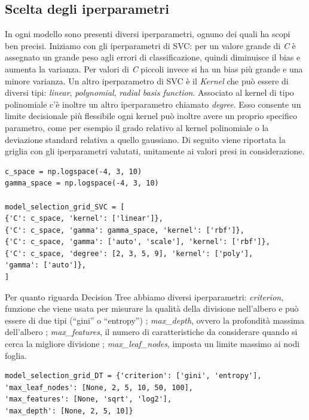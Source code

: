 \documentclass[12pt,italian]{report}
\begin{document}
\subsection{Scelta degli iperparametri}
\label{iperparametri}
In ogni modello sono presenti diversi iperparametri, ognuno dei quali ha scopi ben precisi. 
Iniziamo con gli iperparametri di SVC: per un valore grande di \emph{C} è assegnato un grande peso agli errori di classificazione, quindi diminuisce il bias e aumenta la varianza. Per valori di \emph{C} piccoli invece si ha un bias più grande e una minore varianza. 
Un altro iperparametro di SVC è il \emph{Kernel} che può essere di diversi tipi: \emph{linear}, \emph{polynomial}, \emph{radial basis function}. Associato al kernel di tipo polinomiale c'è inoltre un altro iperparametro chiamato \emph{degree}. Esso consente un limite decisionale più flessibile 
ogni kernel può inoltre avere un proprio specifico parametro, come per esempio il grado relativo al kernel polinomiale o la deviazione standard relativa a quello gaussiano.
Di seguito viene riportata la griglia con gli iperparametri valutati, unitamente ai valori presi in considerazione.

\begin{lstlisting}[frame=single, basicstyle=\footnotesize]
c_space = np.logspace(-4, 3, 10)
gamma_space = np.logspace(-4, 3, 10)

model_selection_grid_SVC = [
{'C': c_space, 'kernel': ['linear']},
{'C': c_space, 'gamma': gamma_space, 'kernel': ['rbf']},
{'C': c_space, 'gamma': ['auto', 'scale'], 'kernel': ['rbf']},
{'C': c_space, 'degree': [2, 3, 5, 9], 'kernel': ['poly'],
'gamma': ['auto']},
]
\end{lstlisting}

Per quanto riguarda Decision Tree abbiamo diversi iperparametri: \emph{criterion}, funzione che viene usata per misurare la qualità della divisione nell'albero e può essere di due tipi (``gini'' o ``entropy'') \cite{scikit-learn}; \emph{max\_depth}, ovvero la profondità massima dell'albero \cite{scikit-learn}; \emph{max\_features}, il numero di caratteristiche da considerare quando si cerca la migliore divisione \cite{scikit-learn}; \emph{max\_leaf\_nodes}, imposta un limite massimo ai nodi foglia.

\begin{lstlisting}[frame=single, basicstyle=\footnotesize]
model_selection_grid_DT = {'criterion': ['gini', 'entropy'],
'max_leaf_nodes': [None, 2, 5, 10, 50, 100],
'max_features': [None, 'sqrt', 'log2'],
'max_depth': [None, 2, 5, 10]}
\end{lstlisting}
\end{document}
